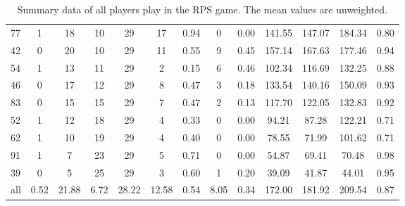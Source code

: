 \documentclass[a4paper,12pt,american]{article}
\theoremstyle{definition}
\begin{document}
\begin{table}[H]
{\begin{tabular}{lcccccccccccc}
77  &     1 &        18 &     10 &    29 &      17 &    0.94 &      0 &   0.00 &  141.55 &  147.07 &  184.34 &  0.80 \\
42  &     0 &        20 &     10 &    29 &      11 &    0.55 &      9 &   0.45 &  157.14 &  167.63 &  177.46 &  0.94 \\
54  &     1 &        13 &     11 &    29 &       2 &    0.15 &      6 &   0.46 &  102.34 &  116.69 &  132.25 &  0.88 \\
46  &     0 &        17 &     12 &    29 &       8 &    0.47 &      3 &   0.18 &  133.54 &  140.16 &  150.09 &  0.93 \\
83  &     0 &        15 &     15 &    29 &       7 &    0.47 &      2 &   0.13 &  117.70 &  122.05 &  132.83 &  0.92 \\
52  &     1 &        12 &     18 &    29 &       4 &    0.33 &      0 &   0.00 &   94.21 &   87.28 &  122.21 &  0.71 \\
62  &     1 &        10 &     19 &    29 &       4 &    0.40 &      0 &   0.00 &   78.55 &   71.99 &  101.62 &  0.71 \\
91  &     1 &         7 &     23 &    29 &       5 &    0.71 &      0 &   0.00 &   54.87 &   69.41 &   70.48 &  0.98 \\
39  &     0 &         5 &     25 &    29 &       3 &    0.60 &      1 &   0.20 &   39.09 &   41.87 &   44.01 &  0.95 \\
\midrule
all &  0.52 &     21.88 &   6.72 &  28.22 &   12.58 &    0.54 &   8.05 &   0.34 &  172.00 &  181.92 &  209.54 &  0.87 \\
\bottomrule
\end{tabular}

}
\caption{Summary data of all players play in the RPS game. The mean values are unweighted.}
\end{table}
\end{document}
